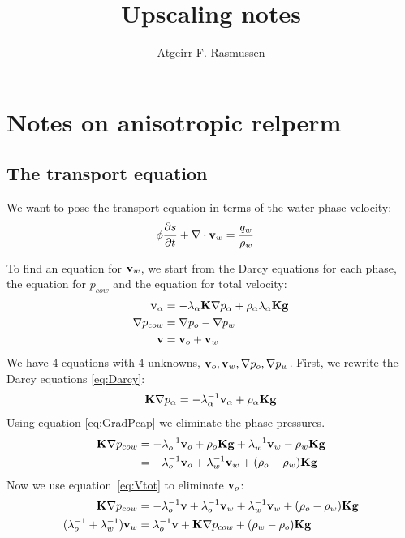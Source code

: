 \documentclass[12pt,a4paper]{scrartcl}
\newcommand{\gb}{{\bf g}}
\newcommand{\vb}{{\bf v}}
\newcommand{\Kb}{{\bf K}}
\begin{document}
\title{Upscaling notes}
\author{Atgeirr F. Rasmussen}


\section{Notes on anisotropic relperm}

\subsection{The transport equation}
We want to pose the transport equation in terms of the water phase velocity:
\begin{align*}
\phi\frac{\partial s}{\partial t} + \nabla\cdot\vb_w  & = \frac{q_w}{\rho_w}
\end{align*}

To find an equation for $\vb_w$,
we start from the Darcy equations for each phase, the equation for
$p_{cow}$ and the equation for total velocity:
\begin{align}
\vb_\alpha & = -\lambda_\alpha\Kb\nabla p_\alpha + \rho_\alpha\lambda_\alpha\Kb\gb \label{eq:Darcy} \\
\nabla p_{cow} & = \nabla p_o - \nabla p_w \label{eq:GradPcap} \\
\vb & = \vb_o + \vb_w \label{eq:Vtot}
\end{align}
We have 4 equations with 4 unknowns, $\vb_o, \vb_w, \nabla p_o, \nabla
p_w$. First, we rewrite the Darcy equations \eqref{eq:Darcy}:
\begin{align*}
 \Kb\nabla p_\alpha & = -\lambda_\alpha^{-1}\vb_\alpha + \rho_\alpha\Kb\gb \\
\end{align*}
Using equation \eqref{eq:GradPcap} we eliminate the phase pressures.
\begin{align*}
 \Kb\nabla p_{cow} & = -\lambda_o^{-1}\vb_o + \rho_o\Kb\gb 
  + \lambda_w^{-1}\vb_w - \rho_w\Kb\gb  \\
  & = -\lambda_o^{-1}\vb_o 
  + \lambda_w^{-1}\vb_w + (\rho_o - \rho_w)\Kb\gb  \\
\end{align*}
Now we use equation~\eqref{eq:Vtot} to eliminate $\vb_o$:
\begin{align*}
 \Kb\nabla p_{cow}
  & = -\lambda_o^{-1}\vb + \lambda_o^{-1}\vb_w + \lambda_w^{-1}\vb_w + (\rho_o - \rho_w)\Kb\gb  \\
  (\lambda_o^{-1} + \lambda_w^{-1})\vb_w
  & = \lambda_o^{-1}\vb + \Kb\nabla p_{cow} + (\rho_w - \rho_o)\Kb\gb
\end{align*}
\end{document}
